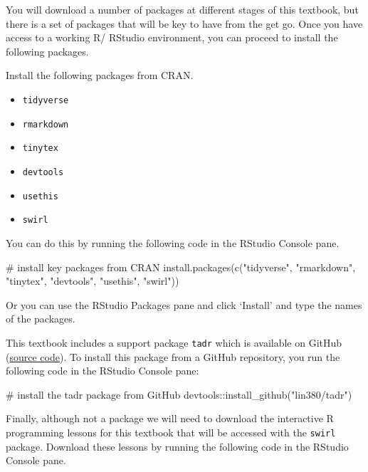 \documentclass[
  letterpaper,
]{latex/krantz}
\newenvironment{Shaded}{\begin{snugshade}}{\end{snugshade}}
\newcommand{\CommentTok}[1]{\textcolor[rgb]{0.37,0.37,0.37}{#1}}
\newcommand{\FunctionTok}[1]{\textcolor[rgb]{0.28,0.35,0.67}{#1}}
\newcommand{\NormalTok}[1]{\textcolor[rgb]{0.00,0.23,0.31}{#1}}
\newcommand{\SpecialCharTok}[1]{\textcolor[rgb]{0.37,0.37,0.37}{#1}}
\newcommand{\StringTok}[1]{\textcolor[rgb]{0.13,0.47,0.30}{#1}}
\providecommand{\tightlist}{%
  \setlength{\itemsep}{0pt}\setlength{\parskip}{0pt}}\usepackage{longtable,booktabs,array}
\begin{document}
You will download a number of packages at different stages of this
textbook, but there is a set of packages that will be key to have from
the get go. Once you have access to a working R/ RStudio environment,
you can proceed to install the following packages.

Install the following packages from CRAN.

\begin{itemize}
\tightlist
\item
  \texttt{tidyverse}
\item
  \texttt{rmarkdown}
\item
  \texttt{tinytex}
\item
  \texttt{devtools}
\item
  \texttt{usethis}
\item
  \texttt{swirl}
\end{itemize}

You can do this by running the following code in the RStudio Console
pane.

\begin{Shaded}
\begin{Highlighting}[]
 \CommentTok{\# install key packages from CRAN}
\FunctionTok{install.packages}\NormalTok{(}\FunctionTok{c}\NormalTok{(}\StringTok{"tidyverse"}\NormalTok{, }\StringTok{"rmarkdown"}\NormalTok{, }\StringTok{"tinytex"}\NormalTok{, }\StringTok{"devtools"}\NormalTok{, }\StringTok{"usethis"}\NormalTok{, }\StringTok{"swirl"}\NormalTok{))}
\end{Highlighting}
\end{Shaded}

Or you can use the RStudio Packages pane and click `Install' and type
the names of the packages.

This textbook includes a support package \texttt{tadr} which is
available on GitHub (\href{https://github.com/lin380/tadr}{source
code}). To install this package from a GitHub repository, you run the
following code in the RStudio Console pane:

\begin{Shaded}
\begin{Highlighting}[]
\CommentTok{\# install the tadr package from GitHub}
\NormalTok{devtools}\SpecialCharTok{::}\FunctionTok{install\_github}\NormalTok{(}\StringTok{"lin380/tadr"}\NormalTok{) }
\end{Highlighting}
\end{Shaded}

Finally, although not a package we will need to download the interactive
R programming lessons for this textbook that will be accessed with the
\texttt{swirl} package. Download these lessons by running the following
code in the RStudio Console pane.
\end{document}
